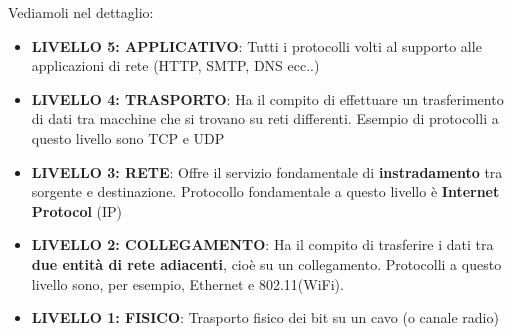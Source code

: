 \documentclass[12pt]{article}
\begin{document}
Vediamoli nel dettaglio:
\begin{itemize}
    \item \textbf{LIVELLO 5: APPLICATIVO}: Tutti i protocolli volti al supporto alle applicazioni di rete (HTTP, SMTP, DNS ecc..)
    \item \textbf{LIVELLO 4: TRASPORTO}: Ha il compito di effettuare un trasferimento di dati tra macchine che si trovano su reti differenti. Esempio di protocolli a questo livello sono TCP e UDP
    \item \textbf{LIVELLO 3: RETE}: Offre il servizio fondamentale di \textbf{instradamento} tra sorgente e destinazione. Protocollo fondamentale a questo livello è \textbf{Internet Protocol} (IP)
    \item \textbf{LIVELLO 2: COLLEGAMENTO}: Ha il compito di trasferire i dati tra \textbf{due entità di rete adiacenti}, cioè su un collegamento. Protocolli a questo livello sono, per esempio, Ethernet e 802.11(WiFi).
    \item \textbf{LIVELLO 1: FISICO}: Trasporto fisico dei bit su un cavo (o canale radio)
\end{itemize}
\end{document}
